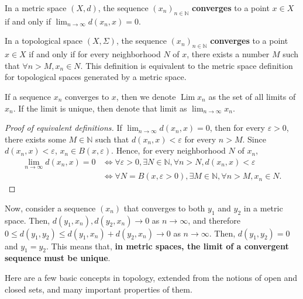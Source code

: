 \begin{definition}[Limits]
\label{def:Limits}
  In a metric space \( (X, d) \), the sequence \( (x_{n})_{n \in \mathbb{N}} \)
  \textbf{converges} to a point \( x \in X \) if and only if \( \lim_{n \to
  \infty} d(x_{n}, x) = 0 \).

  In a topological space \( (X, \Sigma) \), the sequence \( (x_{n})_{n \in
  \mathbb{N}} \) \textbf{converges} to a point \( x \in X \) if and only if for
  every neighborhood \( N \) of \( x \), there exists a number \( M \) such that
  \( \forall  n > M, x_{n} \in N \). This definition is equivalent to the metric
  space definition for topological spaces generated by a metric space.

  If a sequence \( x_{n} \) converges to \( x \), then we denote \(
  \operatorname{Lim} x_{n} \) as the set of all limits of \( x_{n} \). If the
  limit is unique, then denote that limit as \( \lim_{n \to \infty} x_{n} \).
\end{definition}

\begin{proof}[Proof of equivalent definitions]
  If \( \lim_{n \to \infty} d(x_{n}, x) = 0 \), then for every \( \varepsilon >
  0\), there exists some \( M \in \mathbb{N} \) such that \( d(x_{n}, x) <
  \varepsilon \) for every \( n > M \). Since \( d(x_{n}, x) < \varepsilon \),
  \( x_{n} \in B(x, \varepsilon) \). Hence, for every neighborhood \( N \) of \(
  x_{n}\), 
  \begin{align*}
    \lim_{n \to \infty} d(x_{n}, x) = 0 &\iff \forall \varepsilon > 0, \exists
    N \in \mathbb{N}, \forall n > N, d(x_{n}, x) < \varepsilon\\
                                        &\iff \forall N = B(x, \varepsilon > 0),
                                        \exists M \in \mathbb{N}, \forall n > M,
                                        x_{n} \in N
  .\end{align*}
\end{proof}

Now, consider a sequence \( (x_{n}) \) that converges to both \( y_{1} \) and \(
y_{2}\) in a metric space. Then, \( d(y_{1}, x_{n}), d(y_{2}, x_{n}) \to  0 \)
as \( n \to  \infty \), and therefore \( 0 \le d(y_{1}, y_{2}) \le  d(y_{1},
x_{n}) + d(y_{2}, x_{n}) \to 0 \) as \( n \to  \infty\). Then, \( d(y_{1},
y_{2}) = 0 \) and \( y_{1} = y_{2} \). This means that, \textbf{in metric spaces,
the limit of a convergent sequence must be unique}.

Here are a few basic concepts in topology, extended from the notions of open and
closed sets, and many important properties of them.

